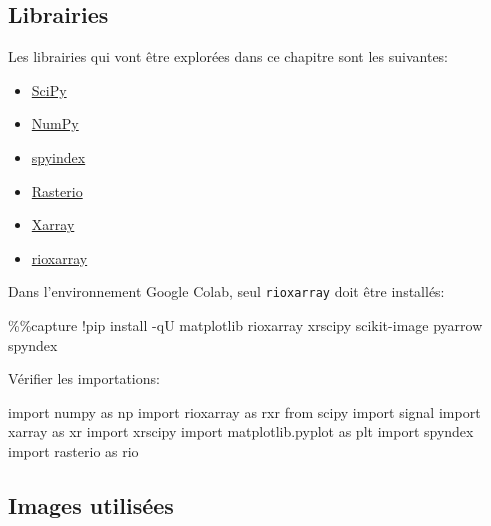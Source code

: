 \documentclass[
  11pt,
  letterpaper,
  open=any,
  twoside=false,
  french]{scrbook}
\newenvironment{Shaded}{\begin{snugshade}}{\end{snugshade}}
\newcommand{\ImportTok}[1]{\textcolor[rgb]{0.00,0.46,0.62}{#1}}
\newcommand{\NormalTok}[1]{\textcolor[rgb]{0.00,0.23,0.31}{#1}}
\newcommand{\OperatorTok}[1]{\textcolor[rgb]{0.37,0.37,0.37}{#1}}
\begin{document}
\subsection{Librairies}\label{librairies-2}

Les librairies qui vont être explorées dans ce chapitre sont les
suivantes:

\begin{itemize}
\item
  \href{https://scipy.org/}{SciPy}
\item
  \href{https://numpy.org/}{NumPy}
\item
  \href{https://github.com/awesome-spectral-indices/spyndex}{spyindex}
\item
  \href{https://rasterio.readthedocs.io/en/stable/}{Rasterio}
\item
  \href{https://docs.xarray.dev/en/stable/}{Xarray}
\item
  \href{https://corteva.github.io/rioxarray/stable/index.html}{rioxarray}
\end{itemize}

Dans l'environnement Google Colab, seul \texttt{rioxarray} doit être
installés:

\begin{Shaded}
\begin{Highlighting}[]
\OperatorTok{\%\%}\NormalTok{capture}
\OperatorTok{!}\NormalTok{pip install }\OperatorTok{{-}}\NormalTok{qU matplotlib rioxarray xrscipy scikit}\OperatorTok{{-}}\NormalTok{image pyarrow spyndex}
\end{Highlighting}
\end{Shaded}

Vérifier les importations:

\begin{Shaded}
\begin{Highlighting}[]
\ImportTok{import}\NormalTok{ numpy }\ImportTok{as}\NormalTok{ np}
\ImportTok{import}\NormalTok{ rioxarray }\ImportTok{as}\NormalTok{ rxr}
\ImportTok{from}\NormalTok{ scipy }\ImportTok{import}\NormalTok{ signal}
\ImportTok{import}\NormalTok{ xarray }\ImportTok{as}\NormalTok{ xr}
\ImportTok{import}\NormalTok{ xrscipy}
\ImportTok{import}\NormalTok{ matplotlib.pyplot }\ImportTok{as}\NormalTok{ plt}
\ImportTok{import}\NormalTok{ spyndex}
\ImportTok{import}\NormalTok{ rasterio }\ImportTok{as}\NormalTok{ rio}
\end{Highlighting}
\end{Shaded}

\subsection{Images utilisées}\label{images-utilisuxe9es}
\end{document}
